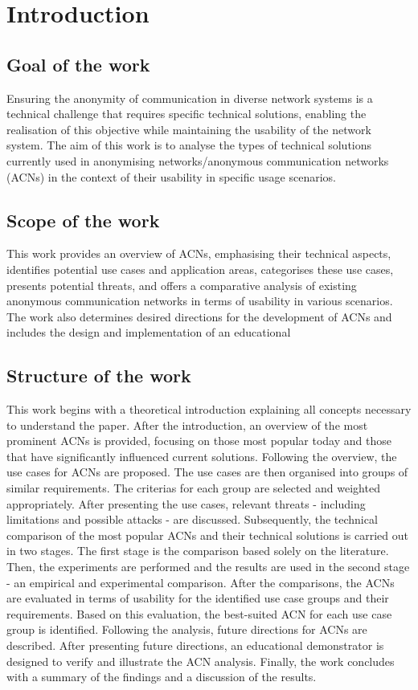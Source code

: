 \chapter{Introduction}

\section{Goal of the work}
Ensuring the anonymity of communication in diverse network systems is a technical challenge that requires specific technical solutions, enabling the realisation of this objective while maintaining the usability of the network system. The aim of this work is to analyse the types of technical solutions currently used in anonymising networks/anonymous communication networks (ACNs) in the context of their usability in specific usage scenarios.

\section{Scope of the work}
This work provides an overview of ACNs, emphasising their technical aspects, identifies potential use cases and application areas, categorises these use cases, presents potential threats, and offers a comparative analysis of existing anonymous communication networks in terms of usability in various scenarios. The work also determines desired directions for the development of ACNs and includes the design and implementation of an educational

\section{Structure of the work}
This work begins with a theoretical introduction explaining all concepts necessary to understand the paper.
After the introduction, an overview of the most prominent ACNs is provided, focusing on those most popular today and those that have significantly influenced current solutions.
Following the overview, the use cases for ACNs are proposed. The use cases are then organised into groups of similar requirements. The criterias for each group are selected and weighted appropriately.
After presenting the use cases, relevant threats - including limitations and possible attacks - are discussed.
Subsequently, the technical comparison of the most popular ACNs and their technical solutions is carried out in two stages. The first stage is the comparison based solely on the literature. Then, the experiments are performed and the results are used in the second stage - an empirical and experimental comparison.
After the comparisons, the ACNs are evaluated in terms of usability for the identified use case groups and their requirements. Based on this evaluation, the best-suited ACN for each use case group is identified.
Following the analysis, future directions for ACNs are described.
After presenting future directions, an educational demonstrator is designed to verify and illustrate the ACN analysis.
Finally, the work concludes with a summary of the findings and a discussion of the results.
